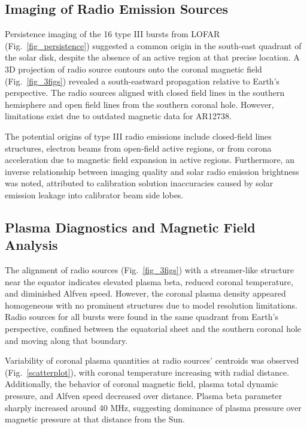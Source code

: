 \subsection{Imaging of Radio Emission Sources}
Persistence imaging of the 16 type III bursts from LOFAR (Fig.~\ref{fig_persistence}) suggested a common origin in the south-east quadrant of the solar disk, despite the absence of an active region at that precise location.
A 3D projection of radio source contours onto the coronal magnetic field (Fig.~\ref{fig_3figs}) revealed a south-eastward propagation relative to Earth's perspective. The radio sources aligned with closed field lines in the southern hemisphere and open field lines from the southern coronal hole. However, limitations exist due to outdated magnetic data for AR12738.

The potential origins of type III radio emissions include closed-field lines structures, electron beams from open-field active regions, or from corona acceleration due to magnetic field expansion in active regions.
Furthermore, an inverse relationship between imaging quality and solar radio emission brightness was noted, attributed to calibration solution inaccuracies caused by solar emission leakage into calibrator beam side lobes.

\subsection{Plasma Diagnostics and Magnetic Field Analysis}
The alignment of radio sources (Fig.~\ref{fig_3figs}) with a streamer-like structure near the equator indicates elevated plasma beta, reduced coronal temperature, and diminished Alfven speed. However, the coronal plasma density appeared homogeneous with no prominent structures due to model resolution limitations.
Radio sources for all bursts were found in the same quadrant from Earth's perspective, confined between the equatorial sheet and the southern coronal hole and moving along that boundary.

Variability of coronal plasma quantities at radio sources' centroids was observed (Fig.~\ref{scatterplot}), with coronal temperature increasing with radial distance. Additionally, the behavior of coronal magnetic field, plasma total dynamic pressure, and Alfven speed decreased over distance. Plasma beta parameter sharply increased around 40 MHz, suggesting dominance of plasma pressure over magnetic pressure at that distance from the Sun.

